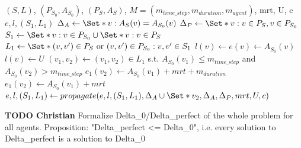 \documentclass{article}
\begin{document}
\begin{algorithm}
	\caption{$Delta_{perfect}$} \label{algo:Deltaperfect}
	\begin{algorithmic}[1]
		\Require $(S,L)$, $(P_{S_0},A_{S_0})$, $(P_S,A_S)$, $M=(m_{time\_step},m_{duration},m_{agent})$, mrt, U, c
	    \Ensure $e,l,(S_1,L_1)$
	    \State $\Delta_A \leftarrow \Set*{v: A_S(v)=A_{S_0}(v)}$
	    \State $\Delta_P \leftarrow \Set*{v: v\in P_S, v\in P_{S_0}}$
	    \State $S_1 \leftarrow \Set*{v: v\in P_{S_0}} \cup \Set*{v: v\in P_{S}}$
	    \State $L_1 \leftarrow \Set*{(v,v^\prime) \in P_S \textrm{ or } (v,v^\prime) \in P_{S_0}: v,v^\prime \in S_1}$
	        \State $l(v)\leftarrow e(v)\leftarrow A_{S_0}(v)$
	    \EndFor
	        \State $l(v) \leftarrow U$
	    \EndFor
	    \State $(v_1,v_2) \leftarrow (v_1,v_2) \in L_1$ s.t. $A_{S_0}(v_1)\leq m_{time\_step}$ and $A_{S_0}(v_2)>m_{time\_step}$
            \State $e_1(v_2) \leftarrow A_{S_0}(v_1)+mrt+m_{duration}$
        \Else
            \State $e_1(v_2) \leftarrow A_{S_0}(v_1)+mrt$
        \EndIf
        \EndIf
	    \State $e,l,(S_1,L_1) \leftarrow propagate(e,l,(S_1,L_1),\Delta_A \cup \Set*{v_2}, \Delta_A, \Delta_P, mrt, U, c)$
	\end{algorithmic}
\end{algorithm}

\begin{mdframed}
{\bf TODO Christian}
Formalize Delta_0/Delta_perfect of the whole problem for all agents.
Proposition: "Delta_perfect <= Delta_0", i.e. every solution to Delta_perfect is a solution to Delta_0
\end{mdframed}
\end{document}
